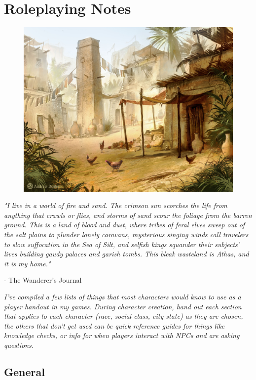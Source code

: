 \chapter{Roleplaying Notes}\label{chap:roleplaying}

\begin{figure}[!htb]
\centering
\includegraphics[width=0.7\linewidth]{images/village.jpg}
\end{figure}

\epigraph{\textit{
"I live in a world of fire and sand. The crimson sun scorches the life from
 anything that crawls or flies, and storms of sand scour the foliage from
 the barren ground. This is a land of blood and dust, where tribes of feral
 elves sweep out of the salt plains to plunder lonely caravans, mysterious
 singing winds call travelers to slow suffocation in the Sea of Silt, and
 selfish kings squander their subjects’ lives building gaudy palaces and
 garish tombs. This bleak wasteland is Athas, and it is my home." } } { - The Wanderer’s Journal }

\textit{I've compiled a few lists of things that most characters would know to use as a player handout in my games.
During character creation, hand out each section that applies to each character (race, social class, city state)
as they are chosen, the others that don't get used can be quick reference guides for things like knowledge checks,
or info for when players interact with NPCs and are asking questions.}

\section{General}

